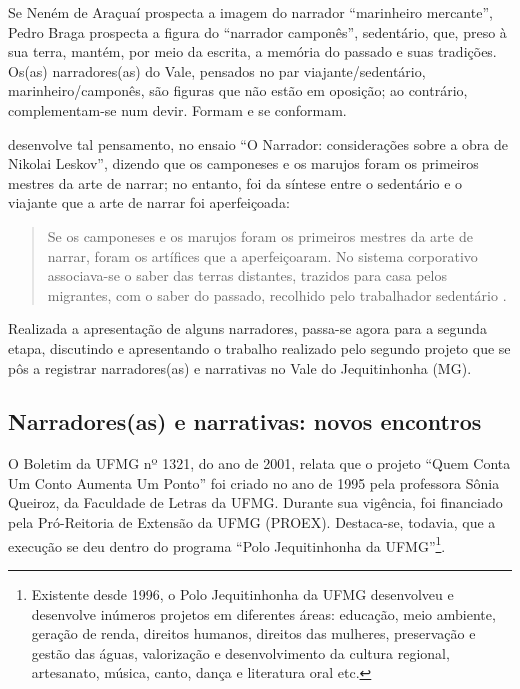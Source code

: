 \documentclass[portuguese]{textolivre}
\begin{document}
Se Neném de Araçuaí prospecta a imagem do narrador “marinheiro mercante”, Pedro Braga prospecta a figura do “narrador camponês”, sedentário, que, preso à sua terra, mantém, por meio da escrita, a memória do passado e suas tradições. Os(as)  narradores(as) do Vale, pensados no par viajante/sedentário, marinheiro/camponês, são figuras que não estão em oposição; ao contrário, complementam-se num devir. Formam e se conformam.

\textcite{Benjamin1985} desenvolve tal pensamento, no ensaio “O Narrador: considerações sobre a obra de Nikolai Leskov”, dizendo que os camponeses e os marujos foram os primeiros mestres da arte de narrar; no entanto, foi da síntese entre o sedentário e o viajante que a arte de narrar foi aperfeiçoada:

\begin{quote}
    Se os camponeses e os marujos foram os primeiros mestres da arte de narrar, foram os artífices que a aperfeiçoaram. No sistema corporativo associava-se o saber das terras distantes, trazidos para casa pelos migrantes, com o saber do passado, recolhido pelo trabalhador sedentário \cite[p. 199]{Benjamin1985}.
\end{quote}

Realizada a apresentação de alguns narradores, passa-se agora para a segunda etapa, discutindo e apresentando o trabalho realizado pelo segundo projeto que se pôs a registrar narradores(as) e narrativas no Vale do Jequitinhonha (MG).

\subsection{Narradores(as) e narrativas: novos encontros}

O Boletim da UFMG nº 1321, do ano de 2001, relata que o projeto “Quem Conta Um Conto Aumenta Um Ponto” foi criado no ano de 1995 pela professora Sônia Queiroz, da Faculdade de Letras da UFMG. Durante sua vigência, foi financiado pela Pró-Reitoria de Extensão da UFMG (PROEX). Destaca-se, todavia, que a execução se deu dentro do programa “Polo Jequitinhonha da UFMG”\footnote{Existente desde 1996, o Polo Jequitinhonha da UFMG desenvolveu e desenvolve inúmeros projetos em diferentes áreas: educação, meio ambiente, geração de renda, direitos humanos, direitos das mulheres, preservação e gestão das águas, valorização e desenvolvimento da cultura regional, artesanato, música, canto, dança e literatura oral etc.}.
\end{document}
